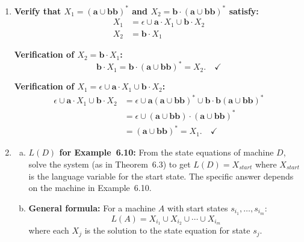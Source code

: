 \begin{enumerate}[{6.}1.]
Given regular expressions $R_1$ and $R_2$ (each describing a FAD language):
\begin{enumerate}[1.]
  \item Convert $R_1$ to an NDFA $A_1$ (using the constructions of Chapter~5 / Theorem~6.5).
  \item Convert $R_2$ to an NDFA $A_2$ similarly.
  \item Apply the subset construction to get DFAs $A_1^d$ and $A_2^d$.
  \item Build the product DFA $A^\cap$ (Lemma~5.1) with $F^\cap=F_1\times F_2$.
  \item Apply Theorem~6.6 (DFA to regular expression) to $A^\cap$ to produce a regular expression for $L(A_1)\cap L(A_2)$.
\end{enumerate}

\item \textbf{Verify that $X_1=(\pmb{a}\cup\pmb{bb})^*$ and $X_2=\pmb{b}\cdot(\pmb{a}\cup\pmb{bb})^*$ satisfy:}
\begin{align*}
  X_1 &= \epsilon\cup\pmb{a}\cdot X_1\cup\pmb{b}\cdot X_2 \\
  X_2 &= \pmb{b}\cdot X_1
\end{align*}

\textbf{Verification of $X_2=\pmb{b}\cdot X_1$:}
\[
  \pmb{b}\cdot X_1 = \pmb{b}\cdot(\pmb{a}\cup\pmb{bb})^* = X_2. \quad\checkmark
\]

\textbf{Verification of $X_1=\epsilon\cup\pmb{a}\cdot X_1\cup\pmb{b}\cdot X_2$:}
\begin{align*}
  \epsilon\cup\pmb{a}\cdot X_1\cup\pmb{b}\cdot X_2
    &= \epsilon\cup\pmb{a}(\pmb{a}\cup\pmb{bb})^*\cup\pmb{b}\cdot\pmb{b}(\pmb{a}\cup\pmb{bb})^* \\
    &= \epsilon\cup(\pmb{a}\cup\pmb{bb})\cdot(\pmb{a}\cup\pmb{bb})^* \\
    &= (\pmb{a}\cup\pmb{bb})^* = X_1. \quad\checkmark
\end{align*}

\item \begin{enumerate}[(a)]
  \item \textbf{$L(D)$ for Example~6.10:}  From the state equations of machine $D$, solve the system (as in Theorem~6.3) to get $L(D)=X_{start}$ where $X_{start}$ is the language variable for the start state.  The specific answer depends on the machine in Example~6.10.

  \item \textbf{General formula:}  For a machine $A$ with start states $s_{i_1},\ldots,s_{i_m}$:
  \[
    L(A) = X_{i_1} \cup X_{i_2} \cup \cdots \cup X_{i_m}
  \]
  where each $X_j$ is the solution to the state equation for state $s_j$.
\end{enumerate}


\end{enumerate}
